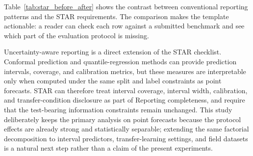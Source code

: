 \documentclass[pdflatex,sn-mathphys-num]{sn-jnl}
\begin{document}
Table~\ref{tab:star_before_after} shows the contrast between conventional reporting patterns and the STAR requirements. The comparison makes the template actionable: a reader can check each row against a submitted benchmark and see which part of the evaluation protocol is missing.

Uncertainty-aware reporting is a direct extension of the STAR checklist. Conformal prediction and quantile-regression methods \cite{mst2024cqr,icsrs2023splitconformal,phme2026conformal,eaai2025explainable} can provide prediction intervals, coverage, and calibration metrics, but these measures are interpretable only when computed under the same split and label constraints as point forecasts. STAR can therefore treat interval coverage, interval width, calibration, and transfer-condition disclosure as part of Reporting completeness, and require that the test-bearing information constraints remain unchanged. This study deliberately keeps the primary analysis on point forecasts because the protocol effects are already strong and statistically separable; extending the same factorial decomposition to interval predictors, transfer-learning settings, and field datasets is a natural next step rather than a claim of the present experiments.

\begin{table}[t]
\centering
\caption{Conventional reporting patterns versus STAR requirements.}
\label{tab:star_before_after}
\small
{}
\end{table}
\end{document}
